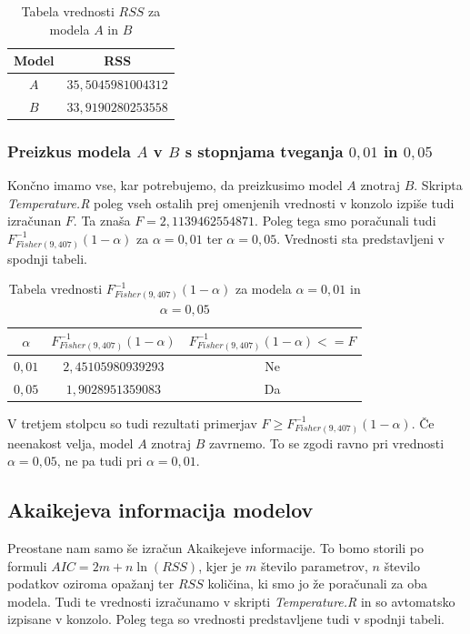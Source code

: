 \documentclass[a4paper, 10pt]{article}
\begin{document}
	\begin{table}[h!]
		\centering
		\begin{tabular}{| c | c |}
			\hline
			Model & RSS \\ \hline
			$A$ & $35{,}5045981004312$ \\ \hline
			$B$ & $33{,}9190280253558$ \\ \hline
		\end{tabular}
		\caption{Tabela vrednosti $RSS$ za modela $A$ in $B$}
	\end{table}
	
	\subsubsection{Preizkus modela $A$ v $B$ s stopnjama tveganja $0{,}01$ in $0{,}05$}\label{subsubsect: 3APreizkus}
		Končno imamo vse, kar potrebujemo, da preizkusimo model $A$ znotraj $B$. Skripta \textit{Temperature.R} poleg vseh ostalih prej omenjenih vrednosti v konzolo izpiše tudi izračunan $F$. Ta znaša $F = 2{,}1139462554871$. Poleg tega smo poračunali tudi $F_{Fisher(9, 407)}^{-1}(1-\alpha)$ za $\alpha = 0{,}01$ ter $\alpha = 0{,}05$. Vrednosti sta predstavljeni v spodnji tabeli.
		
		\begin{table}[h!]
			\centering
			\begin{tabular}{| c | c | c |}
				\hline
				$\alpha$ & $F_{Fisher(9, 407)}^{-1}(1-\alpha)$ & $F_{Fisher(9, 407)}^{-1}(1-\alpha) <= F$\\ \hline
				$0{,}01$ & $2{,}45105980939293$ & Ne \\ \hline
				$0{,}05$ & $1{,}9028951359083$ & Da \\ \hline
			\end{tabular}
			\caption{Tabela vrednosti $F_{Fisher(9, 407)}^{-1}(1-\alpha)$ za modela $\alpha = 0{,}01$ in $\alpha = 0{,}05$}
		\end{table}
		V tretjem stolpcu so tudi rezultati primerjav $F \geq F_{Fisher(9, 407)}^{-1}(1-\alpha)$. Če neenakost velja, model $A$ znotraj $B$ zavrnemo. To se zgodi ravno pri vrednosti $\alpha = 0{,}05$, ne pa tudi pri $\alpha = 0{,}01$. 
		
	\subsection{Akaikejeva informacija modelov}\label{subsect: 3B}
	Preostane nam samo še izračun Akaikejeve informacije. To bomo storili po formuli $AIC = 2m + n\ln(RSS)$, kjer je $m$ število parametrov, $n$ število podatkov oziroma opažanj ter $RSS$ količina, ki smo jo že poračunali za oba modela. Tudi te vrednosti izračunamo v skripti \textit{Temperature.R} in so avtomatsko izpisane v konzolo. Poleg tega so vrednosti predstavljene tudi v spodnji tabeli.
\end{document}
